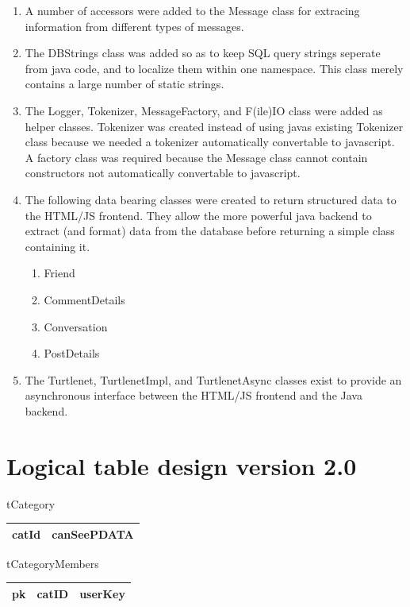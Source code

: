 \begin{enumerate}
\item A number of accessors were added to the Message class for extracing
information from different types of messages.

\item The DBStrings class was added so as to keep SQL query strings seperate
from java code, and to localize them within one namespace. This class merely
contains a large number of static strings.

\item The Logger, Tokenizer,  MessageFactory, and F(ile)IO class were added as
helper classes. Tokenizer was created instead of using javas existing Tokenizer
class because we needed a tokenizer automatically convertable to javascript. A
factory class was required because the Message class cannot contain constructors
not automatically convertable to javascript.

\item The following data bearing classes were created to return structured data
to the HTML/JS frontend. They allow the more powerful java backend to extract
(and format) data from the database before returning a simple class containing
it.
\begin{enumerate}
\item Friend
\item CommentDetails
\item Conversation
\item PostDetails
\end{enumerate}

\item The Turtlenet, TurtlenetImpl, and TurtlenetAsync classes exist to provide
an asynchronous interface between the HTML/JS frontend and the Java backend.
\end{enumerate}

\section{Logical table design version 2.0}

tCategory 
\begin{center}
    \begin{tabular}{ | l | l |}
    \hline
    catId & canSeePDATA \\ \hline
    \end{tabular}
\end{center}

tCategoryMembers
\begin{center}
    \begin{tabular}{ | l | l | l |}
    \hline
    pk & catID & userKey \\ \hline
    \end{tabular}
\end{center}


